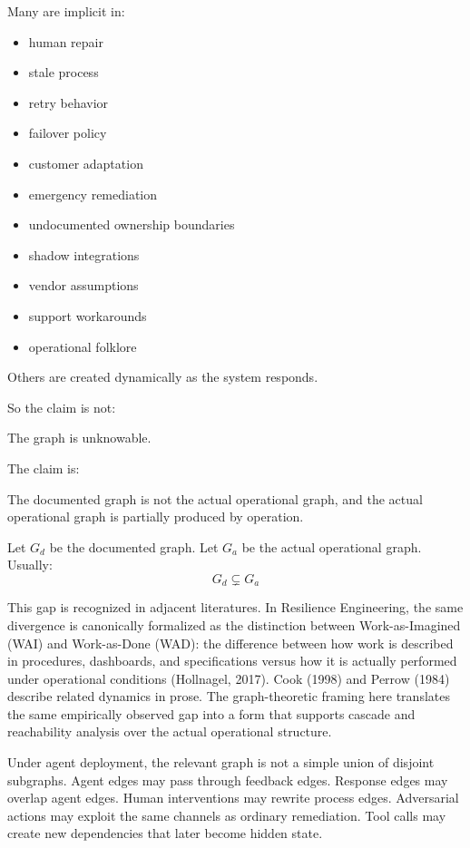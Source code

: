\documentclass[11pt]{article}
\begin{document}
Many are implicit in:
\begin{itemize}
\item human repair
\item stale process
\item retry behavior
\item failover policy
\item customer adaptation
\item emergency remediation
\item undocumented ownership boundaries
\item shadow integrations
\item vendor assumptions
\item support workarounds
\item operational folklore
\end{itemize}

Others are created dynamically as the system responds.

So the claim is not:

\begin{pullquote}
The graph is unknowable.
\end{pullquote}

The claim is:

\begin{pullquote}
The documented graph is not the actual operational graph, and the actual operational graph is partially produced by operation.
\end{pullquote}

Let $G_d$ be the documented graph. Let $G_a$ be the actual operational graph. Usually:
\[
G_d \subsetneq G_a
\]

This gap is recognized in adjacent literatures. In Resilience Engineering, the same divergence is canonically formalized as the distinction between Work-as-Imagined (WAI) and Work-as-Done (WAD): the difference between how work is described in procedures, dashboards, and specifications versus how it is actually performed under operational conditions (Hollnagel, 2017). Cook (1998) and Perrow (1984) describe related dynamics in prose. The graph-theoretic framing here translates the same empirically observed gap into a form that supports cascade and reachability analysis over the actual operational structure.

Under agent deployment, the relevant graph is not a simple union of disjoint subgraphs. Agent edges may pass through feedback edges. Response edges may overlap agent edges. Human interventions may rewrite process edges. Adversarial actions may exploit the same channels as ordinary remediation. Tool calls may create new dependencies that later become hidden state.
\end{document}
